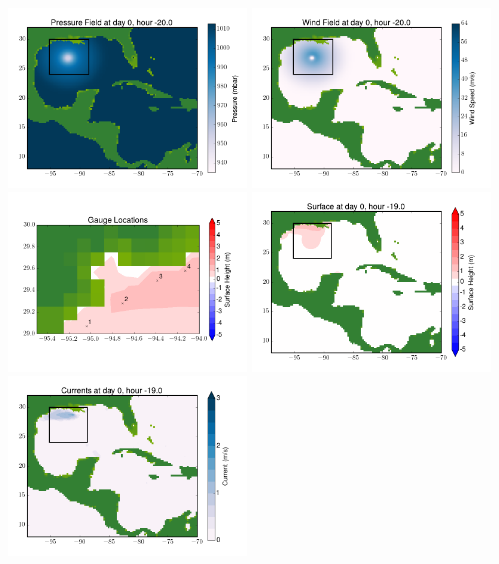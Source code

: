 \documentclass[11pt]{article}
\begin{document}
\includegraphics[width=0.475\textwidth]{frame0052fig8.png}
\vskip 10pt 
\includegraphics[width=0.475\textwidth]{frame0052fig9.png}
\includegraphics[width=0.475\textwidth]{frame0052fig10.png}
\vskip 10pt 
\includegraphics[width=0.475\textwidth]{frame0053fig1.png}
\includegraphics[width=0.475\textwidth]{frame0053fig2.png}
\end{document}
